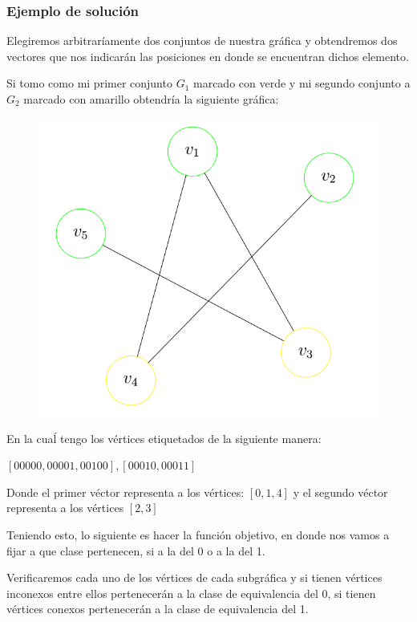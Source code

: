 \documentclass{article}
\begin{document}
\subsubsection*{Ejemplo de solución}
Elegiremos arbitraríamente dos conjuntos de nuestra gráfica y 
obtendremos dos vectores que nos indicarán las posiciones en donde se
encuentran dichos elemento.

Si tomo como mi primer conjunto $G_1$ marcado con verde y mi 
segundo conjunto a $G_2$ marcado con amarillo obtendría la 
siguiente gráfica:

\begin{figure}[h]
\begin{center}
\includegraphics[scale=0.25]{./img/biPartitionGraph}
\end{center}
\end{figure}
En la cuaĺ tengo los vértices etiquetados de la siguiente manera:

$[00000,00001,00100],[00010, 00011]$

Donde el primer véctor representa a los vértices: $[0,1,4]$ y el
segundo véctor representa a los vértices $[2,3]$

Teniendo esto, lo siguiente es hacer la función objetivo, en  donde 
nos vamos a fijar a que clase pertenecen, si a la del 0 o a la del 1.

Verificaremos cada uno de los vértices de cada subgráfica y si tienen
vértices inconexos entre ellos pertenecerán a la clase de 
equivalencia del 0, si tienen vértices conexos pertenecerán a la 
clase de equivalencia del 1.
\end{document}
